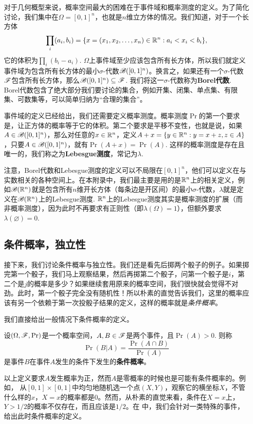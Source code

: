 对于几何概型来说，概率空间最大的困难在于事件域和概率测度的定义。为了简化讨论，我们集中在$\Omega=[0,1]^n$，也就是$n$维立方体的情况。我们知道，对于一个长方体
\[\prod_i(a_i,b_i)=\{x=(x_1,x_2,\ldots,x_n)\in\mathbb{R}^n:a_i<x_i<b_i\},\]
它的体积为$\prod_i(b_i-a_i)$. $\Omega$上事件域至少应该包含所有长方体，所以我们就定义事件域为包含所有长方体的最小$\sigma$-代数$\mathscr{B}([0,1]^n)$。换言之，如果还有一个$\sigma$-代数$\mathscr{F}$包含所有长方体，那么$\mathscr{B}([0,1]^n)\subseteq\mathscr{F}$. 我们将这一$\sigma$-代数称为\textbf{Borel代数}. Borel代数包含了绝大部分我们要讨论的集合，例如开集、闭集、单点集、有限集、可数集等，可以简单归纳为“合理的集合”。

事件域的定义已经给出，我们还需要定义概率测度。概率测度$\Pr$的第一个要求是，让正方体的概率等于它的体积。第二个要求是平移不变性，也就是说，如果$A\in\mathscr{B}([0,1]^n)$，那么对任意的$x\in\mathbb{R}^n$，定义$A+x=\{y\in\mathbb{R}^n:y=x+z,z\in A\}$，只要$A\in\mathscr{B}([0,1]^n)$，就有$\Pr(A+x)=\Pr(A)$. 这样的概率测度是存在且唯一的，我们称之为\textbf{Lebesgue测度}，常记为$\lambda$.

注意，Borel代数和Lebesgue测度的定义可以不局限在$[0,1]^n$，他们可以定义在与实数相关的各种空间上。在本附录中，我们最主要是用的是$\mathbb{R}^n$上的相关定义，例如$\mathscr{B}(\mathbb{R}^n)$就是包含所有$n$维开长方体（每条边是开区间）的最小$\sigma$-代数，$\lambda$就是定义在$\mathscr{B}(\mathbb{R}^n)$上的Lebesgue测度. $\mathbb{R}^n$上的Lebesgue测度其实是概率测度的扩展（而非概率测度），因为此时不再要求有正则性（即$\lambda(\Omega)=1$），但额外要求$\lambda(\varnothing)=0$.

\subsection{条件概率，独立性}
接下来，我们讨论条件概率与独立性。我们还是看先后掷两个骰子的例子。如果掷完第一个骰子，我们马上观察结果，然后再掷第二个骰子，问第一个骰子是$i$，第二个是$j$的概率是多少？如果继续套用原来的概率空间，我们很快就会觉得不对劲。此时，第一个骰子完全没有随机性！所以朴素的直觉告诉我们，这里的概率应该有另一个依赖于第一次投骰子结果的定义，这样的概率就是\emph{条件概率}。

我们直接给出一般情况下条件概率的定义。

\begin{definition}[条件概率]
设$(\Omega,\mathscr{F},\Pr)$是一个概率空间，$A,B\in\mathscr{F}$是两个事件，且$\Pr(A)>0$. 则称
\[
    \Pr(B|A) = \frac{\Pr(A\cap B)}{\Pr(A)}
\]
是事件$B$在事件$A$发生的条件下发生的\textbf{条件概率}。
\end{definition}

以上定义要求$A$发生概率为正，然而$A$是零概率的时候也是可能有条件概率的。例如，
从$[0,1]\times[0,1]$中均匀地随机选一个点$(X,Y)$，观察它的横坐标$X$，不管什么样的$x$，$X=x$的概率都是$0$。然而，从朴素的直觉来看，条件在$X=x$上，$Y>1/2$的概率不仅存在，而且应该是$1/2$。在 中，我们会针对一类特殊的事件，给出此时条件概率的定义。

